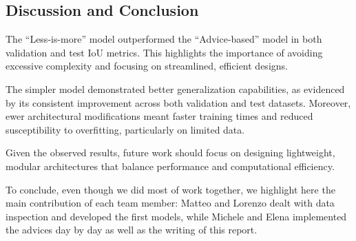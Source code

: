 \documentclass[11pt]{article}
\begin{document}
\begin{multicols*}{2}

    \section{Discussion and Conclusion} %
    \label{sec:discussion}

    The “Less-is-more” model outperformed the “Advice-based” model in both validation and test IoU metrics. This highlights the importance of avoiding excessive complexity and focusing on streamlined, efficient designs.

    The simpler model demonstrated better generalization capabilities, as evidenced by its consistent improvement across both validation and test datasets.
    Moreover, ewer architectural modifications meant faster training times and reduced susceptibility to overfitting, particularly on limited data.

    Given the observed results, future work should focus on designing lightweight, modular architectures that balance performance and computational efficiency.

    To conclude, even though we did most of work together, we highlight here the main contribution of each team member: Matteo and Lorenzo dealt with data inspection and developed the first models, while Michele and Elena implemented the advices day by day as well as the writing of this report.

    
    
    
    
    \end{multicols*}
\end{document}
